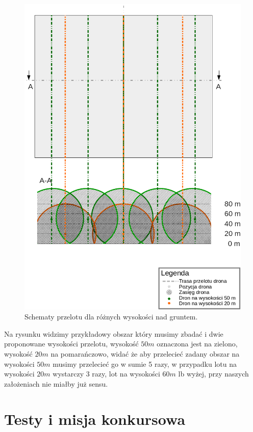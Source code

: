 \begin{figure}[!th]
    \centering
    \includegraphics[width=15cm]{zalaczniki/obrazy/schemat_przelotu.png}
    \caption{Schematy przelotu dla różnych wysokości nad gruntem.}
    \label{fig:schematprzelotu}
\end{figure}

Na rysunku widzimy przykładowy obszar który musimy zbadać i dwie proponowane wysokości przelotu, wysokość $50 m$ oznaczona jest na zielono, wysokość $20 m$ na pomarańczowo, widać że aby przelecieć zadany obszar na wysokości $50 m$ musimy przelecieć go w sumie 5 razy, w przypadku lotu na wysokości $20 m$ wystarczy 3 razy, lot na wysokości $60 m$ lb wyżej, przy naszych założeniach nie miałby już sensu.

\section{Testy i misja konkursowa}

